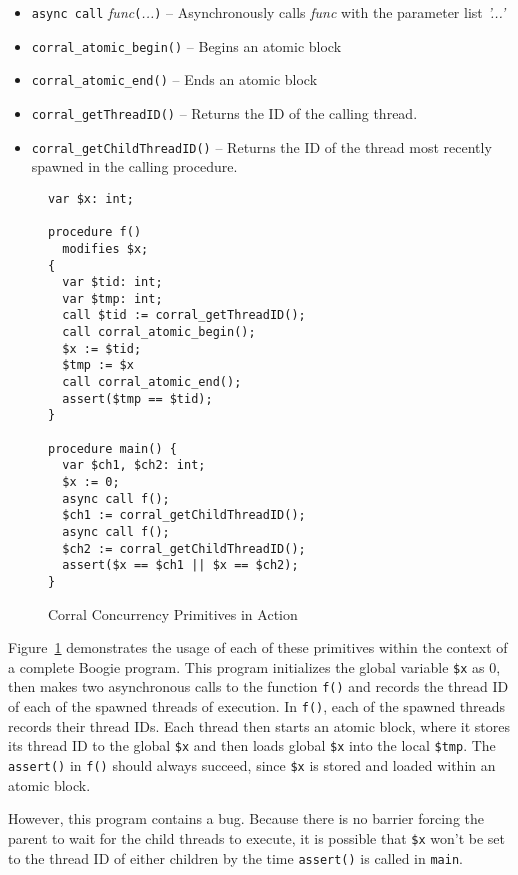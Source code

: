 \begin{itemize}
\item \lstinline|async call|
  \emph{func}\lstinline|(|\emph{...}\lstinline|)| -- Asynchronously
  calls \emph{func} with the parameter list \emph{'...'} 
\item \lstinline|corral_atomic_begin()| -- Begins an atomic block
\item \lstinline|corral_atomic_end()| -- Ends an atomic block
\item \lstinline|corral_getThreadID()| -- Returns the ID of the
  calling thread.
\item \lstinline|corral_getChildThreadID()| -- Returns the ID of the
  thread most recently spawned in the calling procedure. 
\end{itemize}

\begin{figure}[h]
\centering
\caption{Corral Concurrency Primitives in Action}
\label{fig:corralprimitives}
\begin{lstlisting}[language=boogie]
var $x: int;

procedure f() 
  modifies $x;
{
  var $tid: int;
  var $tmp: int;
  call $tid := corral_getThreadID();
  call corral_atomic_begin();
  $x := $tid;
  $tmp := $x
  call corral_atomic_end();
  assert($tmp == $tid);
}

procedure main() {
  var $ch1, $ch2: int;
  $x := 0;
  async call f();
  $ch1 := corral_getChildThreadID();
  async call f();
  $ch2 := corral_getChildThreadID();
  assert($x == $ch1 || $x == $ch2);
}
\end{lstlisting}
\end{figure}

Figure~\ref{fig:corralprimitives} demonstrates the usage of each of
these primitives within the context of a complete Boogie program.
This program initializes the global variable \lstinline|$x| as 0, then
makes two asynchronous calls to the function \lstinline|f()| and
records the thread ID of each of the spawned threads of execution.  In
\lstinline|f()|, each of the spawned threads records their thread IDs.
Each thread then starts an atomic block, where it stores its thread ID
to the global \lstinline|$x| and then loads global \lstinline|$x| into
the local \lstinline|$tmp|.  The \lstinline|assert()| in
\lstinline|f()| should always succeed, since \lstinline|$x| is stored
and loaded within an atomic block. 

However, this program contains a bug.  Because there is no barrier
forcing the parent to wait for the child threads to execute, it is
possible that \lstinline|$x| won't be set to the thread ID of either
children by the time \lstinline|assert()| is called in
\lstinline|main|.

